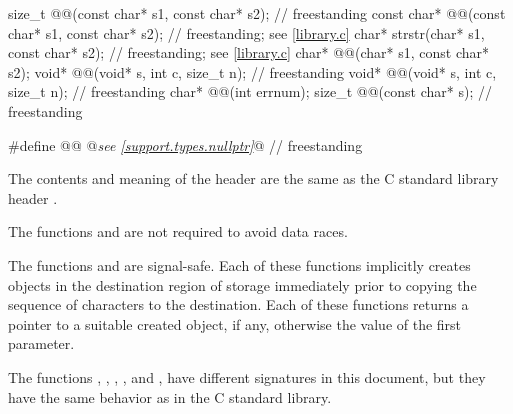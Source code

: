 \begin{codeblock}
{  size_t @@(const char* s1, const char* s2);                        // freestanding
  const char* @@(const char* s1, const char* s2);                   // freestanding; see \ref{library.c}
  char* strstr(char* s1, const char* s2);                               // freestanding; see \ref{library.c}
  char* @@(char* s1, const char* s2);
  void* @@(void* s, int c, size_t n);                               // freestanding
  void* @@(void* s, int c, size_t n);                      // freestanding
  char* @@(int errnum);
  size_t @@(const char* s);                                         // freestanding
}

#define @@ @\textit{see \ref{support.types.nullptr}}@                                                // freestanding
\end{codeblock}

\pnum
The contents and meaning of the header 
are the same as the C standard library header .

\pnum
The functions  and  are not required to avoid data
races.

\pnum
{}%
%
The functions  and  are signal-safe.
Each of these functions implicitly creates objects
in the destination region of storage
immediately prior to copying the sequence of characters to the destination.
Each of these functions returns a pointer to a suitable created object, if any,
otherwise the value of the first parameter.

\pnum
\begin{note}
The functions
, , , , and ,
have different signatures in this document,
but they have the same behavior as in the C standard library.
\end{note}

